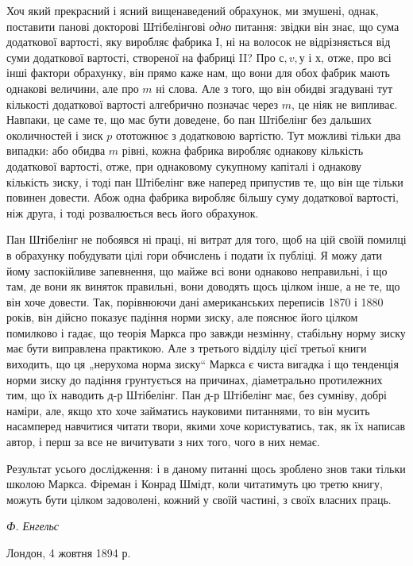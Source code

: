 
Хоч який прекрасний і ясний вищенаведений обрахунок, ми
змушені, однак, поставити панові докторові Штібелінгові \emph{одно}
питання: звідки він знає, що сума додаткової вартості, яку виробляє
фабрика І, ні на волосок не відрізняється від суми додаткової
вартості, створеної на фабриці II? Про $с, v, у$ і $х$, отже,
про всі інші фактори обрахунку, він прямо каже нам, що вони
для обох фабрик мають однакові величини, але про $m$ ні слова.
Але з того, що він обидві згадувані тут кількості додаткової
вартості алгебрично позначає через $m$, це ніяк не випливає.
Навпаки, це саме те, що має бути доведене, бо пан Штібелінг
без дальших околичностей і зиск $p$ ототожнює з додатковою
вартістю. Тут можливі тільки два випадки: або обидва $m$ рівні,
кожна фабрика виробляє однакову кількість додаткової вартості,
отже, при однаковому сукупному капіталі і однакову кількість
зиску, і тоді пан Штібелінг вже наперед припустив те, що він
ще тільки повинен довести. Абож одна фабрика виробляє більшу
суму додаткової вартості, ніж друга, і тоді розвалюється весь
його обрахунок.

Пан Штібелінг не побоявся ні праці, ні витрат для того, щоб
на цій своїй помилці в обрахунку побудувати цілі гори обчислень
і подати їх публіці. Я можу дати йому заспокійливе запевнення,
що майже всі вони однаково неправильні, і що там,
де вони як виняток правильні, вони доводять щось цілком інше,
а не те, що він хоче довести. Так, порівнюючи дані американських
переписів 1870 і 1880 років, він дійсно показує падіння
норми зиску, але пояснює його цілком помилково і гадає, що
теорія Маркса про завжди незмінну, стабільну норму зиску має
бути виправлена практикою. Але з третього відділу цієї третьої
книги виходить, що ця „нерухома норма зиску“ Маркса є чиста
вигадка і що тенденція норми зиску до падіння грунтується на
причинах, діаметрально протилежних тим, що їх наводить д-р
Штібелінг. Пан д-р Штібелінг має, без сумніву, добрі наміри,
але, якщо хто хоче займатись науковими питаннями, то він мусить
насамперед навчитися читати твори, якими хоче користуватись,
так, як їх написав автор, і перш за все не вичитувати
з них того, чого в них немає.

Результат усього дослідження: і в даному питанні щось
зроблено знов таки тільки школою Маркса. Фіреман і Конрад
Шмідт, коли читатимуть цю третю книгу, можуть бути цілком
задоволені, кожний у своїй частині, з своїх власних праць.
\begin{flushright}
  \emph{Ф. Енгельс}
\end{flushright}
Лондон, 4 жовтня 1894 р.
